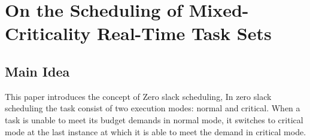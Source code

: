 \section{On the Scheduling of Mixed-Criticality Real-Time Task Sets}

\subsection*{Main Idea}
This paper introduces the concept of Zero slack scheduling, In zero slack scheduling the task consist of two execution modes: normal and critical. When a task is unable to meet its budget demands in normal mode, it switches to critical mode at the last instance at which it is able to meet the demand in critical mode.
